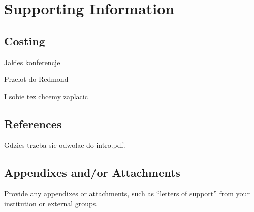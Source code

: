 \documentclass[a4paper,11pt]{article}
\begin{document}
\section{Supporting Information}


\subsection{Costing}

Jakies konferencje

Przelot do Redmond

I sobie tez chcemy zaplacic


\subsection{References}

Gdzies trzeba sie odwolac do intro.pdf.


\subsection{Appendixes and/or Attachments}

Provide any appendixes or attachments, such as ``letters of support''
from your institution or external groups.
\end{document}

